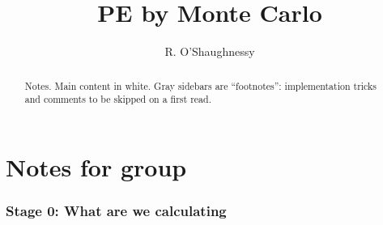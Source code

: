 \documentclass[twocolumn,prd,nofootinbib]{revtex4}
\begin{document}
\title{PE by Monte Carlo}
\author{R. O'Shaughnessy}
\begin{abstract}
Notes. Main content in white.  Gray sidebars are ``footnotes'': implementation tricks and comments to be skipped on a
first read.
\end{abstract}
\maketitle
\tableofcontents
\part{Notes for group}
\nocite{gwastro-HarryFairhurst-CoherentTargetedSearch}

\section{Stage 0: What are we calculating}
\end{document}

